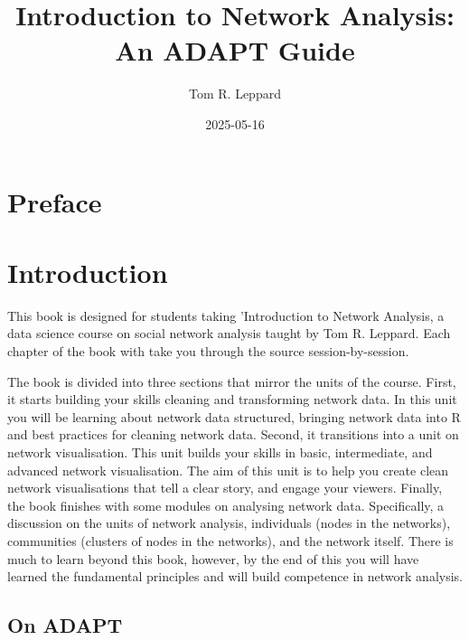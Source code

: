 \documentclass[
  letterpaper,
  DIV=11,
  numbers=noendperiod]{scrreprt}
\title{Introduction to Network Analysis: An ADAPT Guide}
\author{Tom R. Leppard}
\date{2025-05-16}
\renewcommand*\contentsname{Table of contents}
\newcommand\contentsname{Table of contents}
\begin{document}
\maketitle

\renewcommand*\contentsname{Table of contents}
{
\hypersetup{linkcolor=}
\setcounter{tocdepth}{2}
\tableofcontents
}


\chapter*{Preface}\label{preface}



\chapter{Introduction}\label{introduction}

This book is designed for students taking 'Introduction to Network
Analysis, a data science course on social network analysis taught by Tom
R. Leppard. Each chapter of the book with take you through the source
session-by-session.

The book is divided into three sections that mirror the units of the
course. First, it starts building your skills cleaning and transforming
network data. In this unit you will be learning about network data
structured, bringing network data into R and best practices for cleaning
network data. Second, it transitions into a unit on network
visualisation. This unit builds your skills in basic, intermediate, and
advanced network visualisation. The aim of this unit is to help you
create clean network visualisations that tell a clear story, and engage
your viewers. Finally, the book finishes with some modules on analysing
network data. Specifically, a discussion on the units of network
analysis, individuals (nodes in the networks), communities (clusters of
nodes in the networks), and the network itself. There is much to learn
beyond this book, however, by the end of this you will have learned the
fundamental principles and will build competence in network analysis.

\section{On ADAPT}\label{on-adapt}
\end{document}
